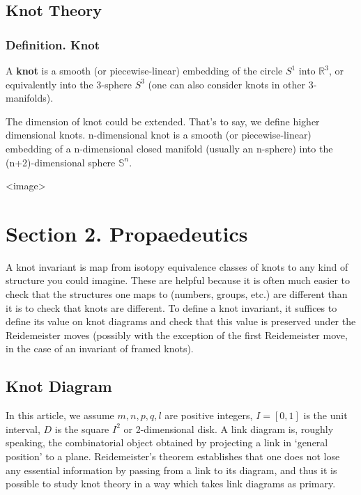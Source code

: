 \documentclass[lang=cn]{elegantpaper}
\begin{document}
\subsection{Knot Theory}
\label{sec:orgd1435f8}
\subsubsection{Definition. Knot}
\label{sec:org95e02f5}
A \textbf{knot} is a smooth (or piecewise-linear) embedding of the circle \(S^{1}\) into \(\mathbb{R}^{3}\), or equivalently into the 3-sphere \(S^{3}\) (one can also consider knots in other 3-manifolds).

The dimension of knot could be extended. That's to say, we define higher dimensional knots. n-dimensional knot is a smooth (or piecewise-linear) embedding of a n-dimensional closed manifold (usually an n-sphere) into the (n+2)-dimensional sphere \(\mathbb{S}^{n}\).

<image>

\section{Section 2. Propaedeutics}
\label{sec:org3a86828}
A knot invariant is map from isotopy equivalence classes of knots to any kind of structure you could imagine. These are helpful because it is often much easier to check that the structures one maps to (numbers, groups, etc.) are different than it is to check that knots are different. To define a knot invariant, it suffices to define its value on knot diagrams and check that this value is preserved under the Reidemeister moves (possibly with the exception of the first Reidemeister move, in the case of an invariant of framed knots).
\subsection{Knot Diagram}
\label{sec:orgb47f033}
In this article, we assume \(m, n, p, q, l\) are positive integers, \(I=[0,1]\) is the unit interval, \(D\) is the square \(I^{2}\) or 2-dimensional disk.
\cite{pretnarIntroductionAlgebraicEffects2015}
A link diagram is, roughly speaking, the combinatorial object obtained by projecting a link in ‘general position’ to a plane. Reidemeister's theorem establishes that one does not lose any essential information by passing from a link to its diagram, and thus it is possible to study knot theory in a way which takes link diagrams as primary.
\end{document}
